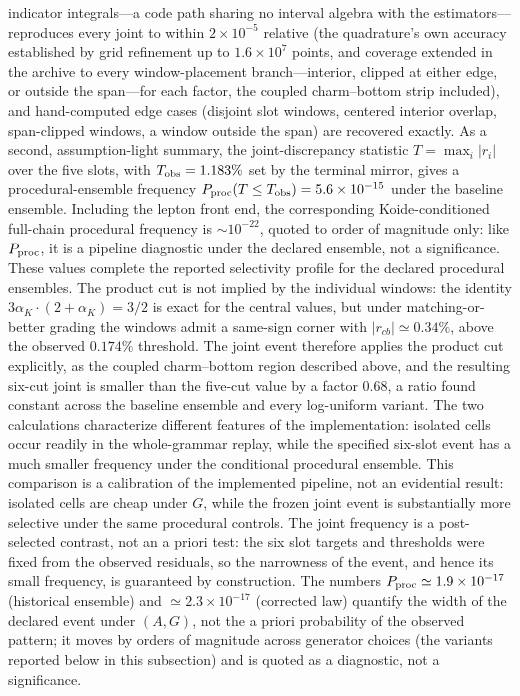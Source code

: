\documentclass[aps,twocolumn,superscriptaddress,nofootinbib,floatfix]{revtex4-2}
\newcommand{\alphaK}{\alpha_K}
\begin{document}
indicator integrals---a code path sharing no interval algebra with the
estimators---reproduces every joint to within $2\times10^{-5}$ relative
(the quadrature's own accuracy established by grid refinement up to
$1.6\times10^7$ points, and coverage extended in the archive to every
window-placement branch---interior, clipped at either edge, or outside
the span---for each factor, the coupled charm--bottom strip included), and hand-computed edge cases
(disjoint slot windows, centered interior overlap, span-clipped windows,
a window outside the span) are recovered
exactly. As a second, assumption-light summary, the
joint-discrepancy statistic $T=\max_i|r_i|$ over the five slots, with
$T_{\rm obs}=1.183\%$ set by the terminal mirror, gives a procedural-ensemble frequency $P_{\rm proc}(T\le T_{\rm obs})=5.6\times10^{-15}$ under the baseline ensemble. Including the lepton front end, the corresponding Koide-conditioned full-chain procedural frequency is $\sim10^{-22}$, quoted to order of magnitude only: like $P_{\rm proc}$, it is a pipeline diagnostic under the declared ensemble, not a significance. These values complete the reported selectivity profile for the declared procedural ensembles. The product cut is not implied by the individual windows: the identity $3\alphaK\cdot(2+\alphaK)=3/2$ is exact for the central values, but under matching-or-better grading the windows admit a same-sign corner with $|r_{cb}|\simeq0.34\%$, above the observed $0.174\%$ threshold. The joint event therefore applies the product cut explicitly, as the coupled charm--bottom region described above, and the resulting six-cut joint is smaller than the five-cut value by a factor $0.68$, a ratio found constant across the baseline ensemble and every log-uniform variant. The two calculations characterize different features of the implementation: isolated cells occur readily in the whole-grammar replay, while the specified six-slot event has a much smaller frequency under the conditional procedural ensemble. This comparison is a calibration of the implemented pipeline, not an evidential result: isolated cells are cheap under $G$, while the frozen joint event is substantially more selective under the same procedural controls. The joint frequency is a post-selected contrast, not an a priori test: the six slot targets and thresholds were fixed from the observed residuals, so the narrowness of the event, and hence its small frequency, is guaranteed by construction. The numbers $P_{\rm proc}\simeq1.9\times10^{-17}$ (historical ensemble) and $\simeq2.3\times10^{-17}$ (corrected law) quantify the width of the declared event under $(A,G)$, not the a priori probability of the observed pattern; it moves by orders of magnitude across generator choices (the variants reported below in this subsection) and is quoted as a diagnostic, not a significance.
\end{document}
